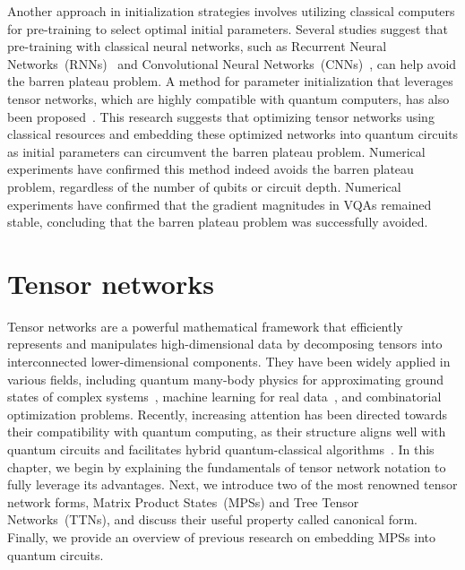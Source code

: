 \documentclass[12pt,dvipdfmx,twoside,openright]{report}
\begin{document}
Another approach in initialization strategies involves utilizing classical computers for pre-training to select optimal initial parameters.
Several studies suggest that pre-training with classical neural networks, such as Recurrent Neural Networks~(RNNs)~\cite{init-strategy-rnn} and Convolutional Neural Networks~(CNNs)~\cite{init-strategy-cnn}, can help avoid the barren plateau problem.
A method for parameter initialization that leverages tensor networks, which are highly compatible with quantum computers, has also been proposed~\cite{rudolph2023synergistic}.
This research suggests that optimizing tensor networks using classical resources and embedding these optimized networks into quantum circuits as initial parameters can circumvent the barren plateau problem.
Numerical experiments have confirmed this method indeed avoids the barren plateau problem, regardless of the number of qubits or circuit depth.
Numerical experiments have confirmed that the gradient magnitudes in VQAs remained stable, concluding that the barren plateau problem was successfully avoided.

\cleardoublepage
\chapter{Tensor networks}
Tensor networks are a powerful mathematical framework that efficiently represents and manipulates high-dimensional data by decomposing tensors into interconnected lower-dimensional components.
They have been widely applied in various fields, including quantum many-body physics for approximating ground states of complex systems~\cite{dmrg-ttn}, machine learning for real data~\cite{MPSsupervised}, and combinatorial optimization problems.
Recently, increasing attention has been directed towards their compatibility with quantum computing, as their structure aligns well with quantum circuits and facilitates hybrid quantum-classical algorithms~\cite{tn-qc}.
In this chapter, we begin by explaining the fundamentals of tensor network notation to fully leverage its advantages. 
Next, we introduce two of the most renowned tensor network forms, Matrix Product States~(MPSs) and Tree Tensor Networks~(TTNs), and discuss their useful property called canonical form. 
Finally, we provide an overview of previous research on embedding MPSs into quantum circuits.

\end{document}
